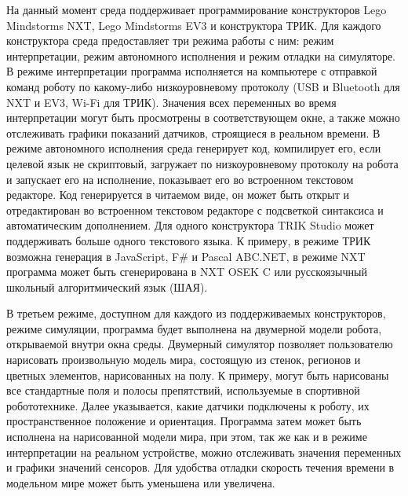 \documentclass[a5paper]{article}
\begin{document}
На данный момент среда поддерживает программирование конструкторов Lego Mindstorms NXT, Lego Mindstorms EV3 и 
конструктора ТРИК. Для каждого конструктора среда предоставляет три режима работы с ним: режим интерпретации, 
режим автономного исполнения и режим отладки на симуляторе. В режиме интерпретации программа исполняется на 
компьютере с отправкой команд роботу по какому-либо низкоуровневому протоколу (USB и Bluetooth для NXT и EV3, 
Wi-Fi для ТРИК). Значения всех переменных во время интерпретации могут быть просмотрены в соответствующем окне, 
а также можно отслеживать графики показаний датчиков, строящиеся в реальном времени. В режиме автономного исполнения 
среда генерирует код, компилирует его, если целевой язык не скриптовый, загружает по низкоуровневому протоколу 
на робота и запускает его на исполнение, показывает его во встроенном текстовом редакторе. Код генерируется в 
читаемом виде, он может быть открыт и отредактирован во встроенном текстовом редакторе с подсветкой синтаксиса 
и автоматическим дополнением. Для одного конструктора TRIK Studio может поддерживать больше одного текстового языка. 
К примеру, в режиме ТРИК возможна генерация в JavaScript, F\# и Pascal ABC.NET, в режиме NXT программа может 
быть сгенерирована в NXT OSEK C или русскоязычный школьный алгоритмический язык (ШАЯ).

В третьем режиме, доступном для каждого из поддерживаемых конструкторов, режиме симуляции, программа будет 
выполнена на двумерной модели робота, открываемой внутри окна среды. Двумерный симулятор позволяет пользователю 
нарисовать произвольную модель мира, состоящую из стенок, регионов и цветных элементов, нарисованных на полу. 
К примеру, могут быть нарисованы все стандартные поля и полосы препятствий, используемые в спортивной робототехнике. 
Далее указывается, какие датчики подключены к роботу, их пространственное положение и ориентация. Программа затем 
может быть исполнена на нарисованной модели мира, при этом, так же как и в режиме интерпретации на реальном 
устройстве, можно отслеживать значения переменных и графики значений сенсоров. Для удобства отладки скорость 
течения времени в модельном мире может быть уменьшена или увеличена.
\end{document}
